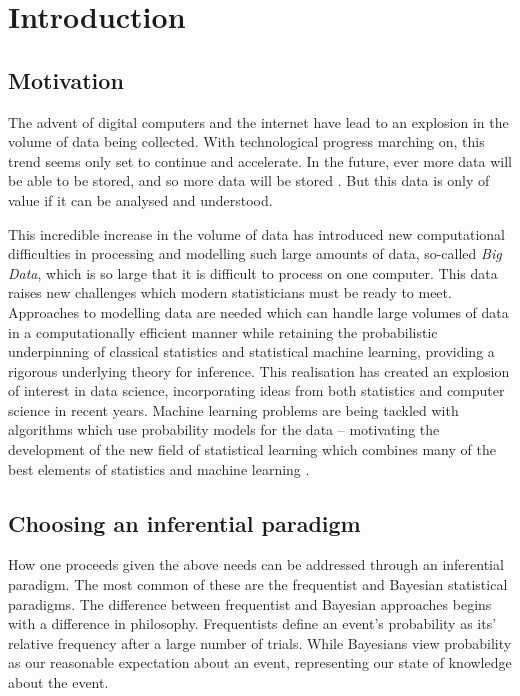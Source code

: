 \chapter{Introduction}

\section{Motivation}
The advent of digital computers and the internet have lead to an explosion in the volume of data being
collected. With technological progress marching on, this trend seems only set to continue and accelerate. In
the future, ever more data will be able to be stored, and so more data will be stored \citep{Gandomi2015}. But
this data is only of value if it can be analysed and understood.

This incredible increase in the volume of data has introduced new computational difficulties in processing and
modelling such large amounts of data, so-called \emph{Big Data}, which is so large that it is difficult to process on
one computer. This data raises new challenges which modern statisticians must be ready to meet. Approaches to
modelling data are needed which can handle large volumes of data in a computationally efficient manner while
retaining the probabilistic underpinning of classical statistics and statistical machine learning, providing a
rigorous underlying theory for inference. This realisation has created an explosion of interest in data
science, incorporating ideas from both statistics and computer science in recent years. Machine learning
problems are being tackled with algorithms which use probability models for the data -- motivating the
development of the new field of statistical learning which combines many of the best elements of statistics
and machine learning \citep{James:2014:ISL:2517747, MacKay:2002:ITI:971143, hastie01statisticallearning,
Murphy:2012:MLP:2380985}.

\section{Choosing an inferential paradigm}
How one proceeds given the above needs can be addressed through an inferential paradigm. The most common of
these are  the frequentist and Bayesian statistical paradigms. The difference between frequentist and Bayesian
approaches begins with a difference in philosophy. Frequentists define an event's probability as its' relative
frequency after a large number of trials. While Bayesians view probability as our reasonable expectation about
an event, representing our state of knowledge about the event.

